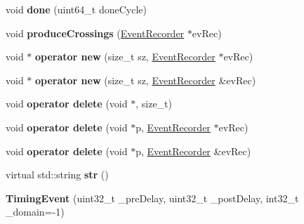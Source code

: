 \begin{DoxyCompactItemize}
\item 
\hypertarget{classTimingEvent_a9e2c0c90bd80d105616121374a7d33e1}{void {\bfseries done} (uint64\-\_\-t done\-Cycle)}\label{classTimingEvent_a9e2c0c90bd80d105616121374a7d33e1}

\item 
\hypertarget{classTimingEvent_a3ec74069d3a97dd192c171a79fef46a4}{void {\bfseries produce\-Crossings} (\hyperlink{classEventRecorder}{Event\-Recorder} $\ast$ev\-Rec)}\label{classTimingEvent_a3ec74069d3a97dd192c171a79fef46a4}

\item 
\hypertarget{classTimingEvent_a9ecb818af70278d593b7b3532aad03e2}{void $\ast$ {\bfseries operator new} (size\-\_\-t sz, \hyperlink{classEventRecorder}{Event\-Recorder} $\ast$ev\-Rec)}\label{classTimingEvent_a9ecb818af70278d593b7b3532aad03e2}

\item 
\hypertarget{classTimingEvent_accb87e44bcbb3a7c4393d4f64af87192}{void $\ast$ {\bfseries operator new} (size\-\_\-t sz, \hyperlink{classEventRecorder}{Event\-Recorder} \&ev\-Rec)}\label{classTimingEvent_accb87e44bcbb3a7c4393d4f64af87192}

\item 
\hypertarget{classTimingEvent_a9efd2a85ed47175399f6a751c109f8a9}{void {\bfseries operator delete} (void $\ast$, size\-\_\-t)}\label{classTimingEvent_a9efd2a85ed47175399f6a751c109f8a9}

\item 
\hypertarget{classTimingEvent_a51a820e571e6bec1fbc9ed0cb751726a}{void {\bfseries operator delete} (void $\ast$p, \hyperlink{classEventRecorder}{Event\-Recorder} $\ast$ev\-Rec)}\label{classTimingEvent_a51a820e571e6bec1fbc9ed0cb751726a}

\item 
\hypertarget{classTimingEvent_ac920ad0905f611841f49c6232947a02e}{void {\bfseries operator delete} (void $\ast$p, \hyperlink{classEventRecorder}{Event\-Recorder} \&ev\-Rec)}\label{classTimingEvent_ac920ad0905f611841f49c6232947a02e}

\item 
\hypertarget{classTimingEvent_ad918cf0b44a8d7298fa4b70b95d04bab}{virtual std\-::string {\bfseries str} ()}\label{classTimingEvent_ad918cf0b44a8d7298fa4b70b95d04bab}

\item 
\hypertarget{classTimingEvent_afe75538f63e735efa562a170d818abd2}{{\bfseries Timing\-Event} (uint32\-\_\-t \-\_\-pre\-Delay, uint32\-\_\-t \-\_\-post\-Delay, int32\-\_\-t \-\_\-domain=-\/1)}\label{classTimingEvent_afe75538f63e735efa562a170d818abd2}


\end{DoxyCompactItemize}
